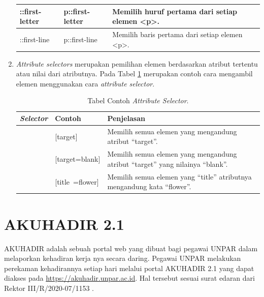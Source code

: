 \begin{enumerate}
\begin{table}[h!]
\begin{tabular}{ | m{8em} | m{3cm}| m{8cm} | }
			\hline
			::first-letter & p::first-letter & Memilih huruf pertama dari setiap elemen <p>. \\ 
			\hline
			::first-line & p::first-line & Memilih baris pertama dari setiap elemen <p>. \\ 
			\hline
		\end{tabular}
	\end{table}
	\item \textit{Attribute selectors} merupakan pemilihan elemen berdasarkan atribut tertentu atau nilai dari atributnya. Pada Tabel \ref{table:attribut} merupakan contoh cara mengambil elemen menggunakan cara \textit{attribute selector}.
	\begin{table}[h!]
		\centering
		\caption{Tabel Contoh \textit{Attribute Selector}.}
		\label{table:attribut}
		\begin{tabular}{ | m{8em} | m{3cm}| m{8cm} | } 
			\hline
			\textit{\textbf{Selector}}& Contoh & Penjelasan \\ 
			\hline
			[attribute] & [target] & Memilih semua elemen yang mengandung atribut ``target''.  \\ 
			\hline
			[attribute=value] & [target=blank] & Memilih semua elemen yang mengandung atribut ``target'' yang nilainya ``blank''. \\ 
			\hline
			[attribute~=value] & [title~=flower] & Memilih semua elemen yang ``title'' atributnya mengandung kata ``flower''.\\ 
			\hline
		\end{tabular}
	\end{table}
\end{enumerate}

\section{AKUHADIR 2.1}
\label{sec:akuhadir}
AKUHADIR adalah sebuah portal web yang dibuat bagi pegawai UNPAR dalam melaporkan kehadiran kerja nya secara daring. Pegawai UNPAR melakukan perekaman kehadirannya setiap hari melalui portal AKUHADIR 2.1 yang dapat diakses pada \url{https://akuhadir.unpar.ac.id}. Hal tersebut sesuai surat edaran dari Rektor III/R/2020-07/1153 \cite{akuhadir}.

